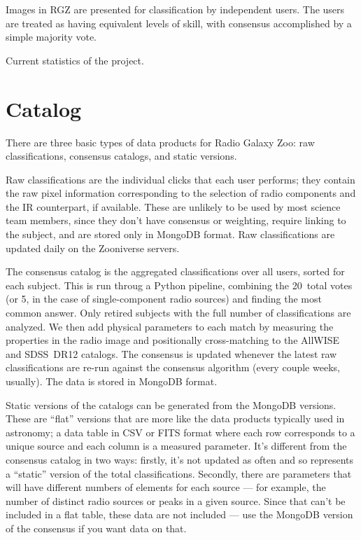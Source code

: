 \documentclass[a4,useAMS,usenatbib]{mn2e}
\begin{document}
Images in RGZ are presented for classification by independent users. The users are treated as having equivalent levels of skill, with consensus accomplished by a simple majority vote. 

Current statistics of the project.

\section{Catalog}\label{sec:catalog}

There are three basic types of data products for Radio Galaxy Zoo: raw classifications, consensus catalogs, and static versions. 
 
Raw classifications are the individual clicks that each user performs; they contain the raw pixel information corresponding to the selection of radio components and the IR counterpart, if available. These are unlikely to be used by most science team members, since they don't have consensus or weighting, require linking to the subject, and are stored only in MongoDB format. Raw classifications are updated daily on the Zooniverse servers. 
 
The consensus catalog is the aggregated classifications over all users, sorted for each subject. This is run throug a Python pipeline, combining the 20~total votes (or 5, in the case of single-component radio sources) and finding the most common answer. Only retired subjects with the full number of classifications are analyzed. We then add physical parameters to each match by measuring the properties in the radio image and positionally cross-matching to the AllWISE \citep{cut13} and SDSS~DR12 \citep{ala15} catalogs. The consensus is updated whenever the latest raw classifications are re-run against the consensus algorithm (every couple weeks, usually). The data is stored in MongoDB format. 
 
Static versions of the catalogs can be generated from the MongoDB versions. These are ``flat'' versions that are more like the data products typically used in astronomy; a data table in CSV or FITS format where each row corresponds to a unique source and each column is a measured parameter. It's different from the consensus catalog in two ways: firstly, it's not updated as often and so represents a ``static'' version of the total classifications. Secondly, there are parameters that will have different numbers of elements for each source --- for example, the number of distinct radio sources or peaks in a given source. Since that can't be included in a flat table, these data are not included --- use the MongoDB version of the consensus if you want data on that. 
 
\end{document}
